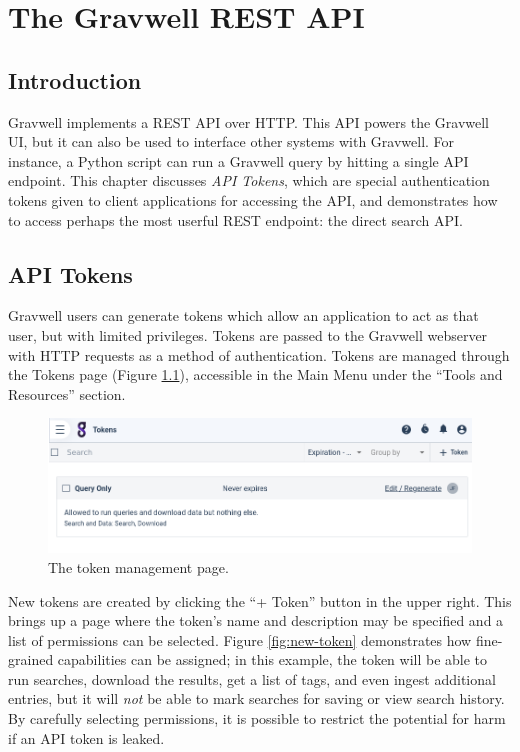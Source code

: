 \chapter{The Gravwell REST API}
\section{Introduction}
Gravwell implements a REST API over HTTP. This API powers the Gravwell UI, but it can also be used to interface other systems with Gravwell. For instance, a Python script can run a Gravwell query by hitting a single API endpoint. This chapter discusses \emph{API Tokens}, which are special authentication tokens given to client applications for accessing the API, and demonstrates how to access perhaps the most userful REST endpoint: the direct search API.

\section{API Tokens}
Gravwell users can generate tokens which allow an application to act as that user, but with limited privileges. Tokens are passed to the Gravwell webserver with HTTP requests as a method of authentication. Tokens are managed through the Tokens page (Figure \ref{fig:token-page}), accessible in the Main Menu under the ``Tools and Resources'' section.

\begin{figure}
	\includegraphics[width=0.8\linewidth]{images/token-page.png}
	\caption{The token management page.}
	\label{fig:token-page}
\end{figure}

New tokens are created by clicking the ``+ Token'' button in the upper right. This brings up a page where the token's name and description may be specified and a list of permissions can be selected. Figure \ref{fig:new-token} demonstrates how fine-grained capabilities can be assigned; in this example, the token will be able to run searches, download the results, get a list of tags, and even ingest additional entries, but it will \emph{not} be able to mark searches for saving or view search history. By carefully selecting permissions, it is possible to restrict the potential for harm if an API token is leaked.

